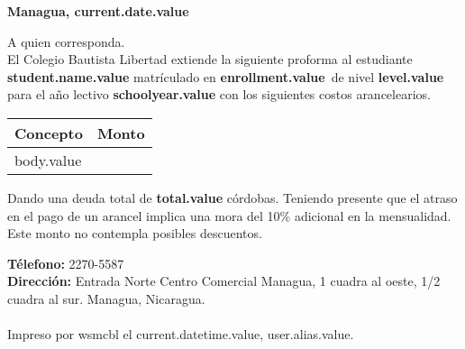 \documentclass[12pt]{article}
\newcommand{\enrollmentName}{enrollment.value}
\newcommand{\levelName}{level.value}
\newcommand{\studentName}{student.name.value}
\newcommand{\schoolYear}{schoolyear.value}
\newcommand{\currentDate}{current.date.value}
\newcommand{\totalAmount}{total.value}
\newcommand{\userAlias}{user.alias.value}
\newcommand{\currentDatetime}{current.datetime.value}
\begin{document}
    \hfill\textbf{Managua, \currentDate}

    A quien corresponda.\\

    El Colegio Bautista Libertad extiende la siguiente proforma al estudiante \textbf{\studentName}
    matrículado en \textbf{\enrollmentName}~de nivel \textbf{\levelName} para el año lectivo \textbf{\schoolYear}
    con los siguientes costos arancelearios.
    
    \begin{table}[H]
        \centering
        \begin{tabular}{|p{4.5cm}|p{2.5cm}|}
            \hline
            Concepto & Monto\\\hline\hline
            body.value
        \end{tabular}
    \end{table}

    Dando una deuda total de \textbf{\totalAmount} córdobas.
    Teniendo presente que el atraso en el pago de un arancel implica una mora del 10\% adicional en la mensualidad.
    Este monto no contempla posibles descuentos.
    
    
    \vspace{2cm}
    \textbf{Télefono:} 2270-5587\\
    \textbf{Dirección:} Entrada Norte Centro Comercial Managua, 1 cuadra al oeste, 1/2 cuadra al sur. Managua, Nicaragua.\\\\
    {\footnotesize Impreso por wsmcbl el \currentDatetime, \userAlias.}
\end{document}
